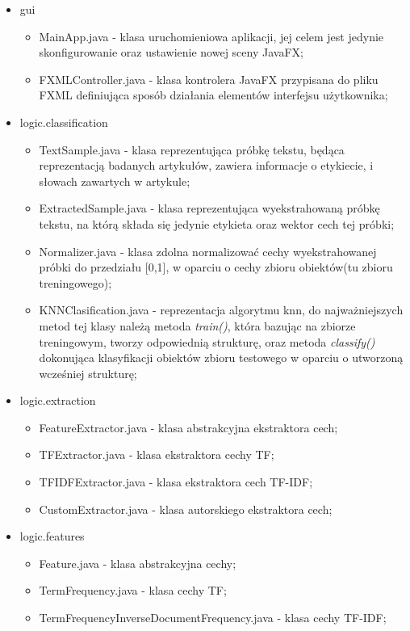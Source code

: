 \documentclass{classrep}
\begin{document}
\begin{itemize}
	\item gui
	\begin{itemize}
		\item MainApp.java - klasa uruchomieniowa aplikacji, jej celem jest jedynie skonfigurowanie oraz ustawienie nowej sceny JavaFX;
		\item FXMLController.java - klasa kontrolera JavaFX przypisana do pliku FXML definiująca sposób działania elementów interfejsu użytkownika;
	\end{itemize}
	\item logic.classification
	\begin{itemize}
		\item TextSample.java - klasa reprezentująca próbkę tekstu, będąca reprezentacją badanych artykułów, zawiera informacje o etykiecie, i słowach zawartych w artykule;
		\item ExtractedSample.java - klasa reprezentująca wyekstrahowaną próbkę tekstu, na którą składa się jedynie etykieta oraz wektor cech tej próbki;
		\item Normalizer.java - klasa zdolna normalizować cechy wyekstrahowanej próbki do przedziału [0,1], w oparciu o cechy zbioru obiektów(tu zbioru treningowego);
		\item KNNClasification.java - reprezentacja algorytmu knn, do najważniejszych metod tej klasy należą metoda \textit{train()}, która bazując na zbiorze treningowym, tworzy odpowiednią strukturę, oraz metoda \textit{classify()} dokonująca klasyfikacji obiektów zbioru testowego w oparciu o utworzoną wcześniej strukturę;
	\end{itemize}
	\item logic.extraction
	\begin{itemize}
		\item FeatureExtractor.java - klasa abstrakcyjna ekstraktora cech;
		\item TFExtractor.java - klasa ekstraktora cechy TF;
		\item TFIDFExtractor.java - klasa ekstraktora cech TF-IDF;
		\item CustomExtractor.java - klasa autorskiego ekstraktora cech;
	\end{itemize}
	\item logic.features
	\begin{itemize}
		\item Feature.java - klasa abstrakcyjna cechy;
		\item TermFrequency.java - klasa cechy TF;
		\item TermFrequencyInverseDocumentFrequency.java - klasa cechy TF-IDF; 

\end{itemize}
\end{itemize}
\end{document}
